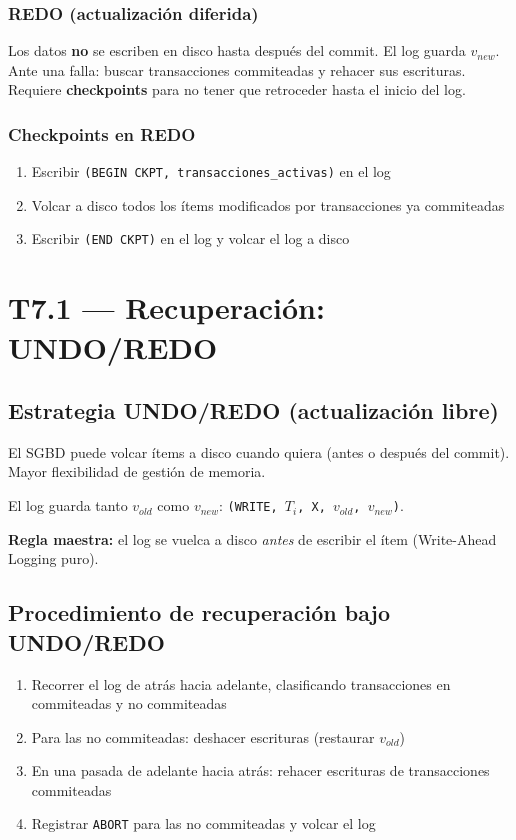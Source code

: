 \documentclass[12pt, a4paper]{article}
\begin{document}
\subsubsection{REDO (actualización diferida)}
Los datos \textbf{no} se escriben en disco hasta después del commit. El log guarda $v_{new}$.
Ante una falla: buscar transacciones commiteadas y rehacer sus escrituras.
Requiere \textbf{checkpoints} para no tener que retroceder hasta el inicio del log.

\subsubsection{Checkpoints en REDO}
\begin{enumerate}
  \item Escribir \texttt{(BEGIN CKPT, transacciones\_activas)} en el log
  \item Volcar a disco todos los ítems modificados por transacciones ya commiteadas
  \item Escribir \texttt{(END CKPT)} en el log y volcar el log a disco
\end{enumerate}

\section{T7.1 — Recuperación: UNDO/REDO}

\subsection{Estrategia UNDO/REDO (actualización libre)}
El SGBD puede volcar ítems a disco cuando quiera (antes o después del commit). Mayor flexibilidad de gestión de memoria.

El log guarda tanto $v_{old}$ como $v_{new}$: \texttt{(WRITE, $T_i$, X, $v_{old}$, $v_{new}$)}.

\textbf{Regla maestra:} el log se vuelca a disco \textit{antes} de escribir el ítem (Write-Ahead Logging puro).

\subsection{Procedimiento de recuperación bajo UNDO/REDO}
\begin{enumerate}
  \item Recorrer el log de atrás hacia adelante, clasificando transacciones en commiteadas y no commiteadas
  \item Para las no commiteadas: deshacer escrituras (restaurar $v_{old}$)
  \item En una pasada de adelante hacia atrás: rehacer escrituras de transacciones commiteadas
  \item Registrar \texttt{ABORT} para las no commiteadas y volcar el log
\end{enumerate}
\end{document}
